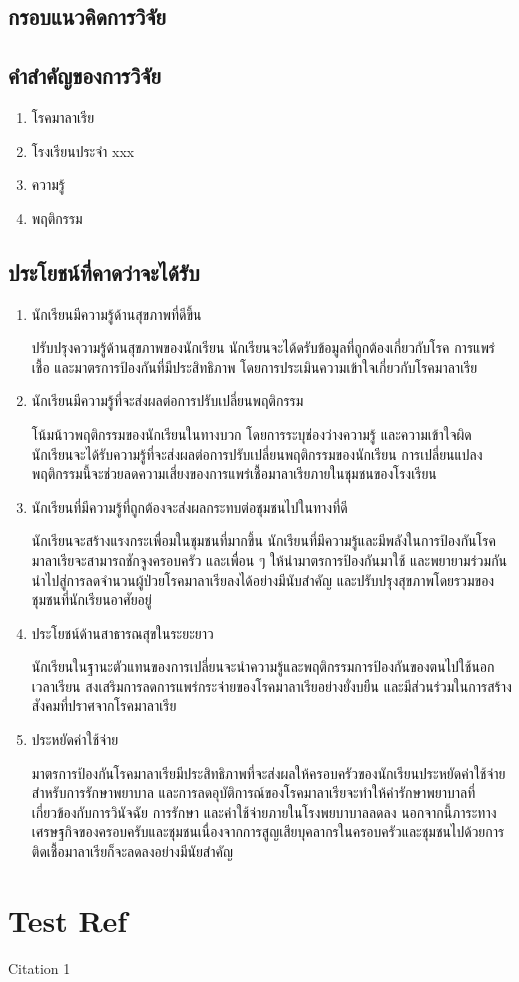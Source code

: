 \documentclass[12pt,twoside]{report}
\begin{document}
\subsection{กรอบแนวคิดการวิจัย}

\subsection{คำสำคัญของการวิจัย}
\begin{enumerate}
    \item โรคมาลาเรีย
    \item โรงเรียนประจำ xxx
    \item ความรู้
    \item พฤติกรรม
\end{enumerate}

\subsection{ประโยชน์ที่คาดว่าจะได้รับ}
\begin{enumerate}
    \item นักเรียนมีความรู้ด้านสุขภาพที่ดีขึ้น

          ปรับปรุงความรู้ด้านสุขภาพของนักเรียน นักเรียนจะได้ดรับข้อมูลที่ถูกต้องเกี่ยวกับโรค การแพร่เชื้อ และมาตรการป้องกันที่มีประสิทธิภาพ โดยการประเมินความเข้าใจเกี่ยวกับโรคมาลาเรีย
    \item นักเรียนมีความรู้ที่จะส่งผลต่อการปรับเปลี่ยนพฤติกรรม

          โน้มน้าวพฤติกรรมของนักเรียนในทางบวก โดยการระบุช่องว่างความรู้ และความเข้าใจผิด นักเรียนจะได้รับความรู้ที่จะส่งผลต่อการปรับเปลี่ยนพฤติกรรมของนักเรียน การเปลี่ยนแปลงพฤติกรรมนี้จะช่วยลดความเสี่ยงของการแพร่เชื้อมาลาเรียภายในชุมชนของโรงเรียน
    \item นักเรียนที่มีความรู้ที่ถูกต้องจะส่งผลกระทบต่อชุมชนไปในทางที่ดี

          นักเรียนจะสร้างแรงกระเพื่อมในชุมชนที่มากขึ้น นักเรียนที่มีความรู้และมีพลังในการป้องกันโรคมาลาเรียจะสามารถชักจูงครอบครัว และเพื่อน ๆ ให้นำมาตรการป้องกันมาใช้ และพยายามร่วมกันนำไปสู่การลดจำนวนผู้ป่วยโรคมาลาเรียลงได้อย่างมีนับสำคัญ และปรับปรุงสุขภาพโดยรวมของชุมชนที่นักเรียนอาศัยอยู่
    \item ประโยชน์ด้านสาธารณสุขในระยะยาว

          นักเรียนในฐานะตัวแทนของการเปลี่ยนจะนำความรู้และพฤติกรรมการป้องกันของตนไปใช้นอกเวลาเรียน สงเสริมการลดการแพร่กระจ่ายของโรคมาลาเรียอย่างยั่งบยืน และมีส่วนร่วมในการสร้างสังคมที่ปราศจากโรคมาลาเรีย
    \item 	ประหยัดค่าใช้จ่าย

          มาตรการป้องกันโรคมาลาเรียมีประสิทธิภาพที่จะส่งผลให้ครอบครัวของนักเรียนประหยัดค่าใช้จ่ายสำหรับการรักษาพยาบาล และการลดอุบัติการณ์ของโรคมาลาเรียจะทำให้ค่ารักษาพยาบาลที่เกี่ยวข้องกับการวินัจฉัย การรักษา และค่าใช้จ่ายภายในโรงพยบาบาลลดลง นอกจากนี้ภาระทางเศรษฐกิจของครอบครับและชุมชนเนื่องจากการสูญเสียบุคลากรในครอบครัวและชุมชนไปด้วยการติดเชื้อมาลาเรียก็จะลดลงอย่างมีนัยสำคัญ
\end{enumerate}
\newpage

\section{Test Ref}
Citation 1 \cite{test01}



\end{document}
